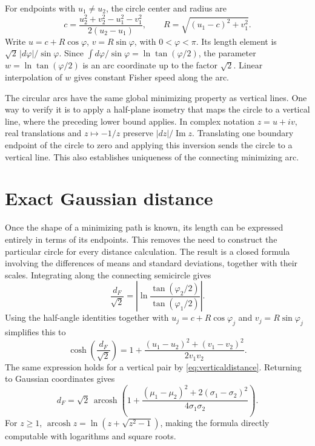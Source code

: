 \documentclass[11pt,oneside,openany]{book}
\theoremstyle{definition}
\theoremstyle{remark}
\newcommand{\arcosh}{\operatorname{arcosh}}
\numberwithin{equation}{chapter}
\begin{document}
For endpoints with $u_1\ne u_2$, the circle center and radius are
\begin{equation}\label{eq:circlecenter}
c=\frac{u_2^2+v_2^2-u_1^2-v_1^2}{2(u_2-u_1)},\qquad
R=\sqrt{(u_1-c)^2+v_1^2}.
\end{equation}
Write $u=c+R\cos\varphi$, $v=R\sin\varphi$, with $0<\varphi<\pi$. Its length element is $\sqrt2\,|d\varphi|/\sin\varphi$. Since $\int d\varphi/\sin\varphi=\ln\tan(\varphi/2)$, the parameter $w=\ln\tan(\varphi/2)$ is an arc coordinate up to the factor $\sqrt2$. Linear interpolation of $w$ gives constant Fisher speed along the arc.

The circular arcs have the same global minimizing property as vertical lines. One way to verify it is to apply a half-plane isometry that maps the circle to a vertical line, where the preceding lower bound applies. In complex notation $z=u+iv$, real translations and $z\mapsto-1/z$ preserve $|dz|/\operatorname{Im}z$. Translating one boundary endpoint of the circle to zero and applying this inversion sends the circle to a vertical line. This also establishes uniqueness of the connecting minimizing arc.

\section{Exact Gaussian distance}
Once the shape of a minimizing path is known, its length can be expressed entirely in terms of its endpoints. This removes the need to construct the particular circle for every distance calculation. The result is a closed formula involving the differences of means and standard deviations, together with their scales.
Integrating along the connecting semicircle gives
\[
\frac{d_F}{\sqrt2}
=\left|\ln\frac{\tan(\varphi_2/2)}{\tan(\varphi_1/2)}\right|.
\]
Using the half-angle identities together with $u_j=c+R\cos\varphi_j$ and $v_j=R\sin\varphi_j$ simplifies this to
\[
\cosh\left(\frac{d_F}{\sqrt2}\right)
=1+\frac{(u_1-u_2)^2+(v_1-v_2)^2}{2v_1v_2}.
\]
The same expression holds for a vertical pair by \eqref{eq:verticaldistance}. Returning to Gaussian coordinates gives
\begin{equation}\label{eq:gaussiandistance}
\boxed{d_F=\sqrt2\,\arcosh\left(1+
\frac{(\mu_1-\mu_2)^2+2(\sigma_1-\sigma_2)^2}{4\sigma_1\sigma_2}\right).}
\end{equation}
For $z\geq1$, $\arcosh z=\ln(z+\sqrt{z^2-1})$, making the formula directly computable with logarithms and square roots.
\end{document}

